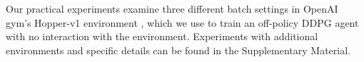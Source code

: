 \documentclass{article}
\begin{document}

Our practical experiments examine three different batch settings in OpenAI gym's Hopper-v1 environment %
\citep{mujoco,OpenAIGym}, which we use to train an off-policy DDPG agent with no interaction with the environment. Experiments with additional environments and specific details can be found in the Supplementary Material. 
\end{document}

